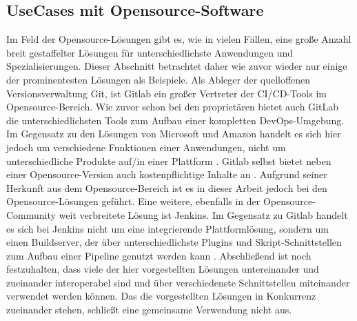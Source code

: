 \subsection{UseCases mit Opensource-Software}
\label{UseCases mit Opensource-Software}
Im Feld der Opensource-Lösungen gibt es, wie in vielen Fällen, eine große Anzahl breit gestaffelter Lösungen für unterschiedlichste Anwendungen und Spezialisierungen. Dieser Abschnitt betrachtet daher wie zuvor wieder nur einige der prominentesten Lösungen als Beispiele.
Als Ableger der quelloffenen Versionsverwaltung Git, ist Gitlab ein großer Vertreter der \acrshort{CI}/\acrshort{CD}-Tools im Opensource-Bereich. Wie zuvor schon bei den proprietären bietet auch GitLab die unterschiedlichsten Tools zum Aufbau einer kompletten \gls{DevOps}-Umgebung. Im Gegensatz zu den Lösungen von Microsoft und Amazon handelt es sich hier jedoch um verschiedene Funktionen einer Anwendungen, nicht um unterschiedliche Produkte auf/in einer Plattform \cite{gitlab_devops}. Gitlab selbst bietet neben einer Opensource-Version auch kostenpflichtige Inhalte an \cite{gitlab_pricing}. Aufgrund seiner Herkunft aus dem Opensource-Bereich ist es in dieser Arbeit jedoch bei den Opensource-Lösungen geführt.
Eine weitere, ebenfalls in der Opensource-Community weit verbreitete Lösung ist Jenkins. Im Gegensatz zu Gitlab handelt es sich bei Jenkins nicht um eine integrierende Plattformlösung, sondern um einen Buildserver, der über unterschiedlichste Plugins und Skript-Schnittstellen zum Aufbau einer Pipeline genutzt werden kann \cite{jenkins_about}.
Abschließend ist noch festzuhalten, dass viele der hier vorgestellten Lösungen untereinander und zueinander interoperabel sind und über verschiedenste Schnittstellen miteinander verwendet werden können. Das die vorgestellten Lösungen in Konkurrenz zueinander stehen, schließt eine gemeinsame Verwendung nicht aus.